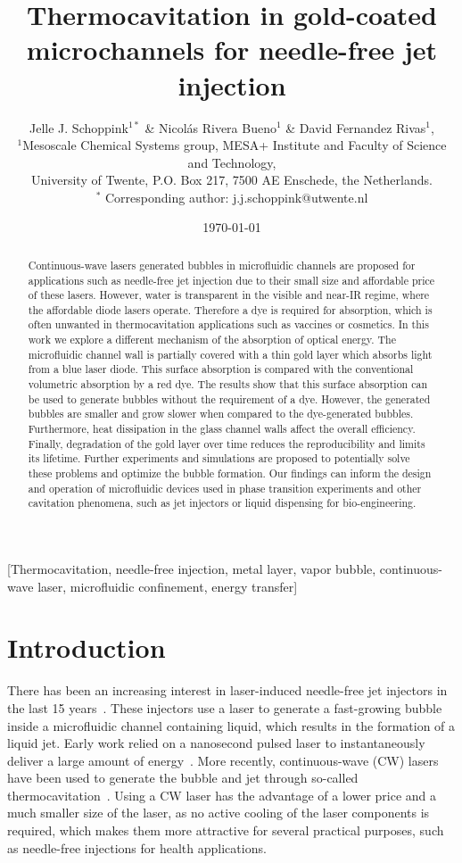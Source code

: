 \documentclass[11pt]{article}
\title{\bf 
\vspace{-0.75in}
Thermocavitation in gold-coated microchannels for needle-free jet injection}
\author{Jelle J. Schoppink$^{1*}$ \& Nicolás Rivera Bueno$^1$ \&
David Fernandez Rivas$^1$, \\ 
\small$^1$Mesoscale Chemical Systems group, MESA+ Institute and Faculty of Science and Technology, \\  
\small University  of Twente, P.O. Box 217, 7500 AE Enschede, the Netherlands. \\
\small $^*$ Corresponding author: j.j.schoppink@utwente.nl}
\date{\today}
\begin{document}
 \maketitle  

    \begin{abstract}
Continuous-wave lasers generated bubbles in microfluidic channels are proposed for applications such as needle-free jet injection due to their small size and affordable price of these lasers. However, water is transparent in the visible and near-IR regime, where the affordable diode lasers operate. Therefore a dye is required for absorption, which is often unwanted in thermocavitation applications such as vaccines or cosmetics. In this work we explore a different mechanism of the absorption of optical energy. The microfluidic channel wall is partially covered with a thin gold layer which absorbs light from a blue laser diode. This surface absorption is compared with the conventional volumetric absorption by a red dye. The results show that this surface absorption can be used to generate bubbles without the requirement of a dye. However, the generated bubbles are smaller and grow slower when compared to the dye-generated bubbles. Furthermore, heat dissipation in the glass channel walls affect the overall efficiency. Finally, degradation of the gold layer over time reduces the reproducibility and limits its lifetime. Further experiments and simulations are proposed to potentially solve these problems and optimize the bubble formation. Our findings can inform the design and operation of microfluidic devices used in phase transition experiments and other cavitation phenomena, such as jet injectors or liquid dispensing for bio-engineering.
\end{abstract}



\vspace{0.1 in}
 [Thermocavitation, needle-free injection, metal layer, vapor bubble, continuous-wave laser, microfluidic confinement, energy transfer]

\vspace{1cm}

\section{Introduction}\label{C4: sec: intro}%
There has been an increasing interest in laser-induced needle-free jet injectors in the last 15 years~\cite{Schoppink2022}. These injectors use a laser to generate a fast-growing bubble inside a microfluidic channel containing liquid, which results in the formation of a liquid jet. Early work relied on a nanosecond pulsed laser to instantaneously deliver a large amount of energy~\cite{Han2012,Tagawa2012}. More recently, continuous-wave (CW) lasers have been used to generate the bubble and jet through so-called thermocavitation~\cite{VanderVen2023,Gonzalez-sierra2023}. Using a CW laser has the advantage of a lower price and a much smaller size of the laser, as no active cooling of the laser components is required, which makes them more attractive for several practical purposes, such as needle-free injections for health applications.
\end{document}
